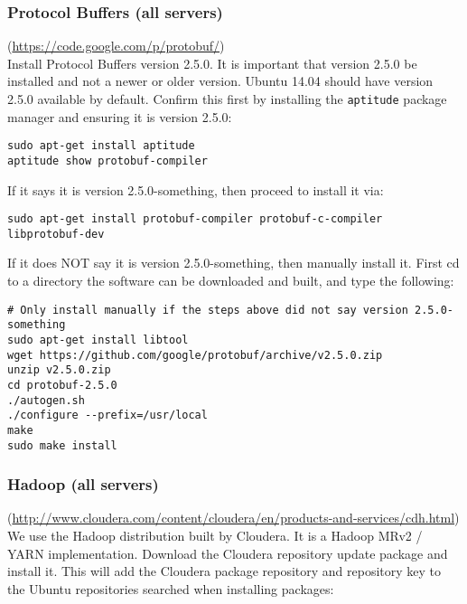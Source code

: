 
\subsubsection{Protocol Buffers (all servers)} (\url{https://code.google.com/p/protobuf/})\\
Install Protocol Buffers version 2.5.0.  It is important that version
2.5.0 be installed and not a newer or older version.  Ubuntu 14.04 should
have version 2.5.0 available by default.  Confirm this first by installing the
\verb|aptitude| package manager and ensuring it is version 2.5.0:

\begin{verbatim}
sudo apt-get install aptitude
aptitude show protobuf-compiler
\end{verbatim}

If it says it is version 2.5.0-something, then proceed to install it via:

\begin{verbatim}
sudo apt-get install protobuf-compiler protobuf-c-compiler libprotobuf-dev
\end{verbatim}

If it does NOT say it is version 2.5.0-something, then manually install
it.  First cd to a directory the software can be downloaded and built,
and type the following:

\begin{verbatim}
# Only install manually if the steps above did not say version 2.5.0-something
sudo apt-get install libtool
wget https://github.com/google/protobuf/archive/v2.5.0.zip
unzip v2.5.0.zip
cd protobuf-2.5.0
./autogen.sh
./configure --prefix=/usr/local
make
sudo make install
\end{verbatim}


\subsubsection{Hadoop (all servers)} (\url{http://www.cloudera.com/content/cloudera/en/products-and-services/cdh.html})\\
We use the Hadoop distribution built by Cloudera.  It is a Hadoop MRv2 /
YARN implementation.  Download the Cloudera repository update package and
install it.  This will add the Cloudera package repository and repository
key to the Ubuntu repositories searched when installing packages:

